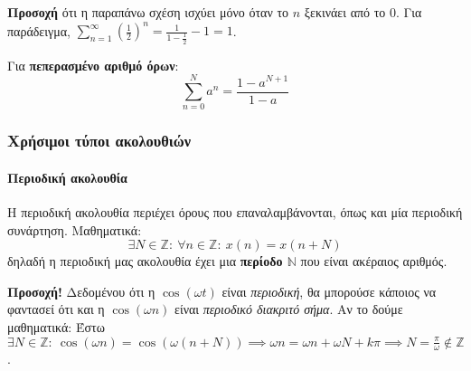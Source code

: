 \documentclass[11pt,a4paper,notitlepage,fleqn,draft]{article}
\begin{document}
\textbf{Προσοχή} ότι η παραπάνω σχέση ισχύει μόνο όταν το \( n \) ξεκινάει από το 0. Για παράδειγμα,
\( \sum_{n=1}^\infty {\left(\frac{1}{2}\right)^n} = \frac{1}{1-\frac{1}{2}}-1 = 1 \).

Για \textbf{πεπερασμένο αριθμό όρων}:
\[
\sum_{n=0}^{N} a^n
= \frac{1-a^{N+1}}{1-a}
\]

\subsubsection{Χρήσιμοι τύποι ακολουθιών}
\paragraph{Περιοδική ακολουθία}
\label{sec:periodic}
Η περιοδική ακολουθία περιέχει όρους που επαναλαμβάνονται, όπως και μία περιοδική συνάρτηση.
Μαθηματικά:
\[
\exists N \in \mathbb Z: \ \forall n \in \mathbb Z: \ x(n) = x(n+N)
\]
δηλαδή η περιοδική μας ακολουθία έχει μια \textbf{περίοδο \( \mathbb N \)} που είναι ακέραιος αριθμός.

\textbf{Προσοχή!} Δεδομένου ότι η \( \cos(\omega t) \) είναι \textit{περιοδική}, θα μπορούσε κάποιος
να φαντασεί ότι και η \( \cos(\omega n) \) είναι \textit{περιοδικό διακριτό σήμα}. Αν το δούμε μαθηματικά:
Έστω \( \exists N \in \mathbb Z:\ \cos(\omega n)=\cos\left( \omega (n+N) \right)
\implies \omega n = \omega n + \omega N + kπ \implies N = \frac{π}{\omega } \notin \mathbb Z \).
\end{document}
